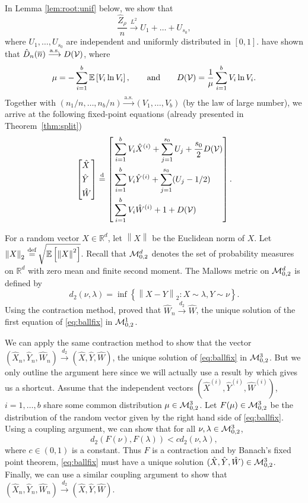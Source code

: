 \documentclass[11pt]{article}
\newcommand{\E}[1]{\mathbb{E} \left[#1\right]}
\newcommand{\mZeroIII}{\cM_{0,2}^{3}}
\newcommand{\mZeroI}{\cM_{0,2}^{1}}
\newcommand{\mZeroD}{\cM_{0,2}^{d}}
\newcommand{\norm}[1]{\left\lVert#1\right\rVert}
\newcommand{\ball}[1]{\hat{#1}}
\def\bX{\ball{X}}
\def\bY{\ball{Y}}
\def\bW{\ball{W}}
\newcommand{\bVec}{(\bX, \bY, \bW)}
\newcommand{\bVecIx}{\left(\bX^{(i)}, \bY^{(i)}, \bW^{(i)}\right)}
\newcommand{\bVecN}{(\bX_n, \bY_n, \bW_n)}
\def\bZ{\ball{Z}}
\newcommand\cM{{\cal M}}
\newcommand\cV{{\cal V}}
\def\R{\mathbb{R}}
\def\m{\mu}
\def\r{\rho}
\numberwithin{theorem}{section}
\theoremstyle{definition}
\newcommand{\dM}{d_2}
\newcommand{\dMto}{\overset{\dM}{\too}}
\newcommand{\inas}{\asto} %
\newcommand{\inLII}{\overset{L^{2}}{\too}}
\newcommand{\eqd}{\,{\buildrel {\mathrm{def}} \over =}\,}
\newcommand{\eql}{\eqdd}%
\newcommand{\nBar}{\overline{n}}
\newcommand{\Toll}{D}
\newcommand{\bToll}{\ball{\Toll}}
\newcommand{\bTollN}{\bToll_{n}}
\numberwithin{equation}{section}
\newcommand{\refT}[1]{Theorem~\ref{#1}}
\newcommand{\too}{\longrightarrow}
\newcommand\asto{\overset{\mathrm{a.s.}}{\too}}
\newcommand\eqdd{\overset{\mathrm{d}}{=}}
\begin{document}
In Lemma \ref{lem:root:unif} below, we show that 
\begin{equation}\label{eq:balluniform}
    \frac{\bZ_\r}{n} \inLII U_1 + \dots + U_{s_0},
\end{equation}
where $U_1,\dots,U_{s_0}$ are independent and uniformly distributed in $[0, 1]$.
\citet{MR3025680} have shown that $\bTollN(\nBar) \inas \Toll(\cV)$, where
\begin{equation}
\m = -\sum_{i=1}^b \E{V_i\ln V_i}, \qquad \text{and} \qquad \Toll(\cV) = \frac{1}{\m} \sum_{i=1}^b V_i\ln V_i.
    \label{eq:tollfunction:ball}
\end{equation}
Together with $(n_1/n,\dots,n_b/n)\inas (V_1,\dots,V_b)$ (by the law of large number),
we arrive at the following fixed-point equations (already presented in \refT{thm:split})
\begin{equation}
    \left[
    \begin{aligned}
        & \bX \\
        & \bY \\
        & \bW
    \end{aligned}
    \right]
    \eql
    \left[
    \begin{aligned}
        & \sum_{i=1}^b V_i \bX^{(i)} + \sum_{j=1}^{s_0} U_j + \frac{s_0}{2} \Toll(\cV)  \\
        & \sum_{i=1}^b V_i \bY^{(i)} + \sum_{j=1}^{s_0} (U_j-1/2) \\
        & \sum_{i=1}^b V_i \bW^{(i)} + 1 + \Toll(\cV)
    \end{aligned}
    \right]
    .
    \label{eq:ballfix}
\end{equation}

For a random vector \(X \in \R^{d}\), let \(\norm{X}\) be the Euclidean norm of \(X\).  Let
\(\norm{X}_{2} \eqd \sqrt{\E{\norm{X}^2}}\).  Recall that \(\mZeroD\) denotes the set of
probability measures on \(\R^{d}\) with zero mean and finite second moment.  The Mallows metric on
\(\mZeroD\) is defined by
\[
\dM(\nu, \lambda) = \inf \left\{ \norm{X - Y}_{2} : X \sim \lambda, Y \sim \nu \right\}
.
\]
Using the {contraction method}, \citet{MR3025680} proved that $\bW_n \dMto \bW$, the unique solution
of the first equation of \eqref{eq:ballfix} in \(\mZeroI\).

We can apply the same contraction method to show that the vector $\bVecN \dMto \bVec$, the unique
solution of \eqref{eq:ballfix} in \(\mZeroIII\).  But we only outline the argument here since we
will actually use a result by \citet{MR1871564} which gives us a shortcut.
Assume that the independent vectors \(\bVecIx\), \(i=1,\dots,b\) share some common distribution \(\mu \in \mZeroIII\).  Let \(F(\mu) \in \mZeroIII\) be the
distribution of the random vector given by the right hand side of \eqref{eq:ballfix}.  Using a
coupling argument, we can show that for all \(\nu, \lambda \in \mZeroIII\), 
\[
    \dM(F(\nu), F(\lambda)) < c \dM(\nu, \lambda),
\]
where \(c \in (0,1)\) is a constant. Thus \(F\) is a
contraction and by Banach's fixed point theorem, \eqref{eq:ballfix} must have a unique solution
\(\bVec \in \mZeroIII\).
Finally, we can use a similar coupling argument to show that \(\bVecN \dMto \bVec\).
\end{document}
